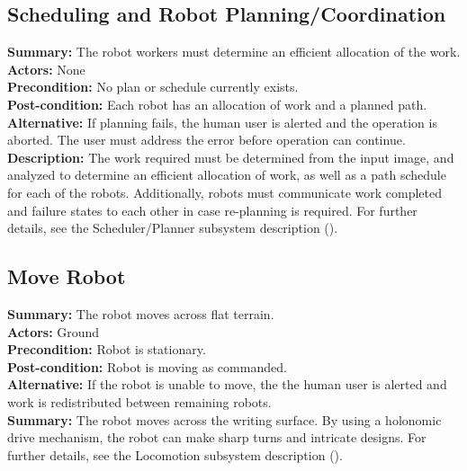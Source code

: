 \subsection{Scheduling and Robot Planning/Coordination}
\textbf{Summary:} The robot workers must determine an efficient allocation of the work. \\
\textbf{Actors:} None \\
\textbf{Precondition:} No plan or schedule currently exists. \\
\textbf{Post-condition:} Each robot has an allocation of work and a planned path. \\
\textbf{Alternative:} If planning fails, the human user is alerted and the operation is aborted. The user must address the error before operation can continue.\\
\textbf{Description:} The work required must be determined from the input image, and analyzed to determine an efficient allocation of work, as well as a path schedule for each of the robots. Additionally, robots must communicate work completed and failure states to each other in case re-planning is required. For further details, see the Scheduler/Planner subsystem description ().\\

\subsection{Move Robot}
\textbf{Summary:} The robot moves across flat terrain. \\
\textbf{Actors:} Ground \\
\textbf{Precondition:} Robot is stationary. \\
\textbf{Post-condition:} Robot is moving as commanded. \\
\textbf{Alternative:} If the robot is unable to move, the the human user is alerted and work is redistributed between remaining robots. \\
\textbf{Summary:} The robot moves across the writing surface. By using a holonomic drive mechanism, the robot can make sharp turns and intricate designs. For further details, see the Locomotion subsystem description ().\\

